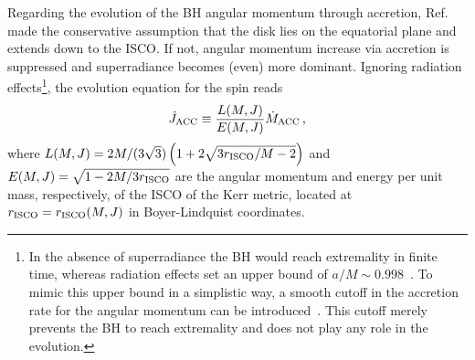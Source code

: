 \documentclass[11pt]{article}
\numberwithin{equation}{section} %
\begin{document}
Regarding the evolution of the BH angular momentum through accretion, Ref.~\cite{Brito:2014wla} made the conservative assumption that the disk lies on the equatorial plane and extends down to the ISCO. 
If not, angular momentum increase via accretion is suppressed and superradiance becomes (even) more dominant.
Ignoring radiation effects\footnote{In the absence of superradiance the BH would reach extremality in finite time, whereas radiation effects set an upper bound of $a/M\sim 0.998$~\cite{Thorne:1974ve}. To mimic this upper bound in a simplistic way, a smooth cutoff in the accretion rate for the angular momentum can be introduced~\cite{Brito:2014wla}. This cutoff merely prevents the BH to reach extremality and does not play any role in the evolution.}, the evolution equation for the spin reads~\cite{Bardeen:1970zz}
%
\begin{equation}
\dot J_{\rm ACC} \equiv \frac{L(M,J)}{E(M,J)} \dot M_{\rm ACC}\,,\label{dotJaccr}
\end{equation}
where $L(M,J)=2M/(3\sqrt{3})\left(1+2 \sqrt{3 r_{\rm ISCO}/{M}-2}\right)$ and $E(M,J)=\sqrt{1-2M/3r_{\rm ISCO}}$ are the angular momentum and energy per unit mass, respectively, of the ISCO of the Kerr metric, located at $r_{\rm ISCO}=r_{\rm ISCO}(M,J)$ in Boyer-Lindquist coordinates. 




\end{document}

